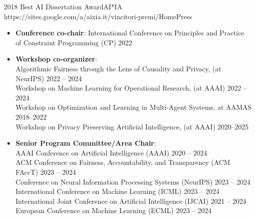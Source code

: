 \documentclass[localFont,alternative]{metadataShortBio}
\begin{document}
\begin{awards}
	\awardentry
	{2018}
	{Best AI Dissertation Award}{AI*IA} %
	{https://sites.google.com/a/aixia.it/vincitori-premi/Home}{Press}


\end{awards}	



  \begin{itemize}[leftmargin=0.4cm]
    \item {\bf Conference co-chair}:  
    {International Conference on Principles and Practice of Constraint Programming (CP)}  \hfill{2022}


    \item {\bf Workshop co-organizer}: \\
    {Algorithmic Fairness through the Lens of Causality and Privacy, (at NeurIPS)} \hfill{2022 -- 2024}\\
    {Workshop on Machine Learning for Operational Research, (at AAAI)}   \hfill{2022 -- 2024}\\
    {Workshop on Optimization and Learning in Multi-Agent Systems, at AAMAS} \hfill{2018--2022}\\
    {Workshop on Privacy Preserving Artificial Intelligence, (at AAAI)}   \hfill{2020--2025}
    
    \item {\bf Senior Program Committee/Area Chair}: \\
    AAAI Conference on Artificial Intelligence (AAAI) \hfill {2020 -- 2024}\\
		ACM Conference on Fairness, Accountability, and Transparency (ACM FAccT) \hfill {2023 -- 2024}\\
    Conference on Neural Information Processing Systems (NeurIPS) \hfill{2023 -- 2024}\\
    International Conference on Machine Learning (ICML) \hfill {2023 -- 2024}\\
    International Joint Conference on Artificial Intelligence (IJCAI) \hfill {2021 -- 2024}\\
    European Conference on Machine Learning (ECML) \hfill{2023 -- 2024}


\end{itemize}
\end{document}
